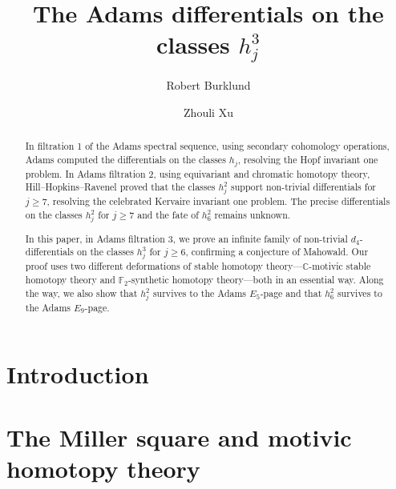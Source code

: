 \documentclass[reqno]{amsart}
\title{The Adams differentials on the classes $h_j^3$}
\author{Robert Burklund}
\author{Zhouli Xu}
\renewcommand{\todo}[1]{}
\renewcommand{\todo}[1]{}
\begin{document}
\begin{abstract}
  In filtration 1 of the Adams spectral sequence, using secondary cohomology operations, Adams \cite{Adams} computed the differentials on the classes $h_j$, resolving the Hopf invariant one problem.
  In Adams filtration 2, using equivariant and chromatic homotopy theory, Hill--Hopkins--Ravenel \cite{HHR} proved that the classes $h_j^2$ support non-trivial differentials for $j 
  \geq 7$, resolving the celebrated Kervaire invariant one problem.
  The precise differentials on the classes $h_j^2$ for $j \geq 7$ and the fate of $h_6^2$ remains unknown. 

  In this paper, in Adams filtration 3, we prove an infinite family of non-trivial $d_4$-differentials on the classes $h_j^3$ for $j \geq 6$, confirming a conjecture of Mahowald.
  Our proof uses two different deformations of stable homotopy theory---$\mathbb{C}$-motivic stable homotopy theory and $\mathbb{F}_2$-synthetic homotopy theory---both in an essential way.
  Along the way, we also show that $h_j^2$ survives to the Adams $E_5$-page and that $h_6^2$ survives to the Adams $E_9$-page.
\end{abstract}

\maketitle

\setcounter{tocdepth}{1}
\tableofcontents
{}



\section{Introduction}
\label{sec:intro}



% 


\section{The Miller square and motivic homotopy theory}
\label{sec:review}

\end{document}

